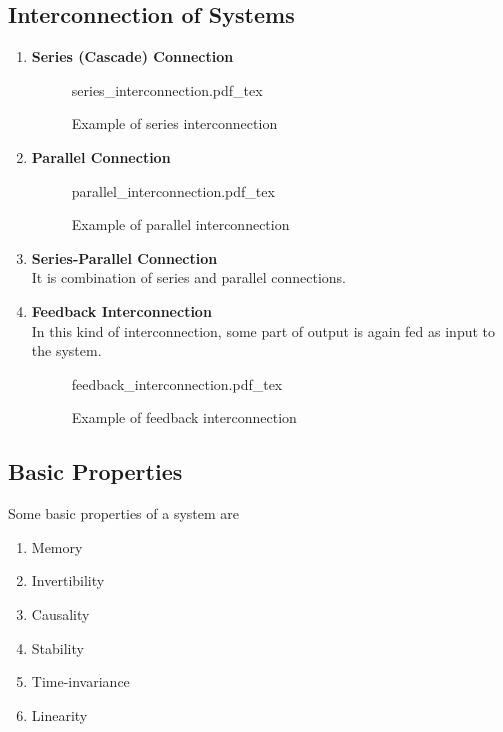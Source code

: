 \documentclass[oneside]{book}
\newcommand{\incfig}[1]{%
    {#1.pdf_tex}
}
\begin{document}
\subsection{Interconnection of Systems}
\begin{enumerate}
	\item \textbf{Series (Cascade) Connection}
	      \begin{figure}[ht]
		      \centering
		      \incfig{series_interconnection}
		      \caption{Example of series interconnection}
	      \end{figure}
	\item \textbf{Parallel Connection}
	      \begin{figure}[ht]
		      \centering
		      \incfig{parallel_interconnection}
		      \caption{Example of parallel interconnection}
	      \end{figure}
	\item \textbf{Series-Parallel Connection}\\
	      It is combination of series and parallel connections.
	\item \textbf{Feedback Interconnection}\\
	      In this kind of interconnection, some part of output is again fed as input to the system.
	      \begin{figure}[ht]
		      \centering
		      \incfig{feedback_interconnection}
		      \caption{Example of feedback interconnection}
	      \end{figure}
\end{enumerate}

\subsection{Basic Properties}
Some basic properties of a system are
\begin{enumerate}
	\item Memory
	\item Invertibility
	\item Causality
	\item Stability
	\item Time-invariance
	\item Linearity
\end{enumerate}



\end{document}
